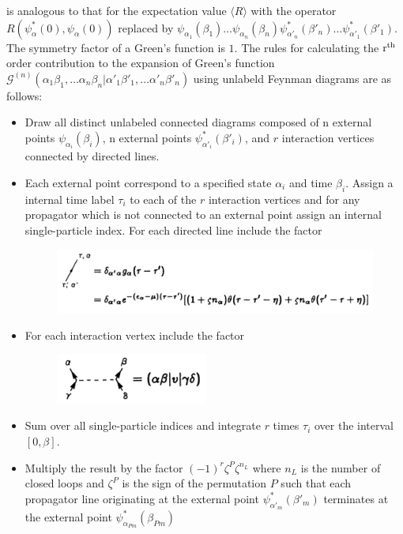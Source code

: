 \documentclass[12pt]{article}
\begin{document}
is analogous to that for the expectation value $\langle R\rangle$ with the 
operator $R(\psi^*_\alpha(0),\psi_\alpha(0))$ replaced by $\psi_{\alpha_1}
(\beta_1)\dots\psi_{\alpha_n}(\beta_n)\psi^*_{\alpha'_n}(\beta'_n)\dots
\psi^*_{\alpha'_1}(\beta'_1)$. The symmetry factor of a Green's function is 
$1$. The rules for calculating the $\rm r^{th}$ order contribution to the 
expansion of Green's function $\mathcal{G}^{(n)}(\alpha_1\beta_1,\dots
\alpha_n\beta_n|\alpha'_1\beta'_1,\dots\alpha'_n\beta'_n)$ using unlabeld 
Feynman diagrams are as follows:
\begin{itemize}
    \item Draw all distinct unlabeled connected diagrams composed of n external 
    points $\psi_{\alpha_i}(\beta_i)$, n external points $\psi^*_{\alpha'_i}
    (\beta'_i)$, and $r$ interaction vertices connected by directed lines.
    \item Each external point correspond to a specified state $\alpha_i$ and 
    time $\beta_i$. Assign a internal time label $\tau_i$ to each of the $r$ 
    interaction vertices and for any propagator which is not connected to an 
    external point assign an internal single-particle index. For each directed 
    line include the factor
    \begin{figure}[H]
        \centering
        \includegraphics[width=15cm]{p15.png}
        \label{}
    \end{figure}
    \item For each interaction vertex include the factor
    \begin{figure}[H]
        \centering
        \includegraphics[width=5cm]{p12.png}
        \label{}
    \end{figure}
    \item Sum over all single-particle indices and integrate $r$ times $\tau_i$ 
    over the interval $[0,\beta]$.
    \item Multiply the result by the factor $(-1)^r\zeta^{P}\zeta^{n_L}$ where 
    $n_L$ is the number of closed loops and $\zeta^P$ is the sign of the 
    permutation $P$ such that each propagator line originating at the external 
    point $\psi^*_{\alpha'_m}(\beta'_m)$ terminates at the external point 
    $\psi^*_{\alpha_{Pm}}(\beta_{Pm})$
\end{itemize}
\end{document}
